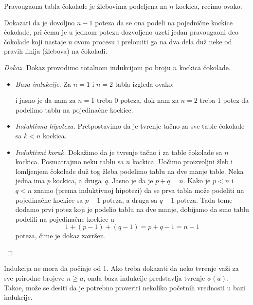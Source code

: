 \begin{EX}
  Pravougaona tabla \v cokolade je \v zlebovima podeljena na $n$ kockica, recimo ovako:
    \begin{center}
      
    \end{center}
  Dokazati da je dovoljno $n - 1$ poteza da se ona
  podeli na pojedni\v cne kockice \v cokolade, pri \v cemu je u jednom potezu dozvoljeno uzeti jedan
  pravougaoni deo \v cokolade koji nastaje u ovom procesu i prelomiti ga na dva dela du\v z neke od
  pravih linija (\v zlebova) na \v cokoladi.
\end{EX}
\begin{proof}[Dokaz]
  Dokaz provodimo totalnom indukcijom po broju $n$ kockica \v cokolade.
  \begin{itemize}
  \item
    \emph{Baza indukcije.} Za $n = 1$ i $n = 2$ tabla izgleda ovako:
    \begin{center}
      
    \end{center}
    i jasno je da nam za $n = 1$ treba 0 poteza, dok nam za $n = 2$ treba 1 potez da podelimo tablu na pojedina\v cne kockice.
  \item
    \emph{Induktivna hipoteza.} Pretpostavimo da je tvr\dj enje ta\v cno za sve table \v cokolade sa $k < n$ kockica.
  \item
    \emph{Induktivni korak.} Doka\v zimo da je tvr\dj enje ta\v cno i za table \v cokolade sa $n$ kockica.
    Posmatrajmo neku tablu sa $n$ kockica.
    Uo\v cimo proizvoljni \v zleb i lomljenjem \v cokolade du\v z tog \v zleba podelimo tablu na dve manje table. Neka jedna ima
    $p$ kockica, a druga~$q$. Jasno je da je $p + q = n$. Kako je $p < n$ i $q < n$ znamo (prema induktivnoj hipotezi)
    da se prva tabla mo\v ze podeliti na pojedina\v cne kockice sa $p - 1$ poteza, a druga sa $q - 1$ poteza. Tada tome
    dodamo prvi potez koji je podelio tablu na dve manje, dobijamo da smo tablu podelili na pojedina\v cne kockice u
    $$
      1 + (p - 1) + (q - 1) = p + q - 1 = n - 1
    $$
    poteza, \v cime je dokaz zavr\v sen.\qedhere
  \end{itemize}
\end{proof}

Indukcija ne mora da po\v cinje od 1. Ako treba dokazati da neko tvr\dj enje va\v zi za sve prirodne brojeve $n \ge a$,
onda baza indukcije predstavlja tvr\dj enje $\phi(a)$. Tako\dj e, mo\v ze se desiti da je potrebno proveriti
nekoliko po\v cetnih vrednosti u bazi indukcije.

